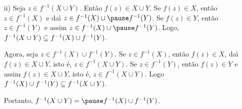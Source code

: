 \documentclass{beamer}
\begin{document}
        \begin{frame}
            \begin{enumerate}
                \item[ii)] Seja $z \in f^{-1}(X \cup Y)$. \pause Ent{\~a}o $f(z) \in X \cup Y$. \pause Se $f(z) \in X$, \pause ent\~ao $z \in f^{-1}(X)$ \pause e da{\'\i} $z \in f^{-1}(X) \cup \pause f^{-1}(Y)$. \pause Se $f(z) \in Y$, \pause ent{\~a}o $z \in f^{-1}(Y)$ \pause e assim $z \in f^{-1}(X) \cup \pause f^{-1}(Y)$. \pause Logo, $f^{-1}(X \cup Y) \subseteq f^{-1}(X) \cup f^{-1}(Y)$.\pause

                \vspace{.3cm}

                Agora, seja $z \in f^{-1}(X) \cup f^{-1}(Y)$. \pause Se $z \in f^{-1}(X)$, \pause ent{\~a}o $f(z) \in X$, \pause da{\'\i} $f(z) \in X \cup Y$, \pause isto {\'e}, \pause $z \in f^{-1}(X \cup Y)$. \pause Se $z \in f^{-1}(Y)$, \pause ent{\~a}o $f(z) \in Y$ \pause e assim $f(z) \in X \cup Y$, \pause isto {\'e}, \pause $z \in f^{-1}(X \cup Y)$. \pause Logo $f^{-1}(X) \cup f^{-1}(Y) \subseteq f^{-1}(X \cup Y)$.\pause

                \vspace{.3cm}

                Portanto, \pause $f^{-1}(X \cup Y) = \pause f^{-1}(X) \cup f^{-1}(Y)$.\pause \hspace{.5cm} \qedsymbol
            \end{enumerate}
    \end{frame}
\end{document}

